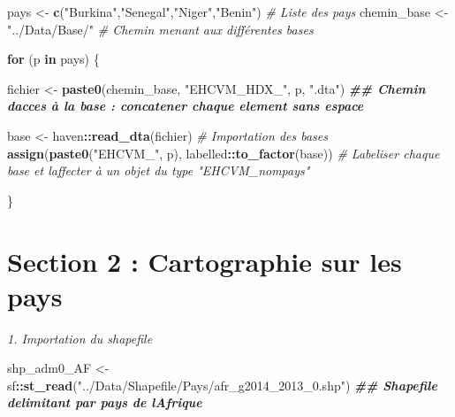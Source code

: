 \documentclass[
]{article}
\newenvironment{Shaded}{\begin{snugshade}}{\end{snugshade}}
\newcommand{\CommentTok}[1]{\textcolor[rgb]{0.56,0.35,0.01}{\textit{#1}}}
\newcommand{\ControlFlowTok}[1]{\textcolor[rgb]{0.13,0.29,0.53}{\textbf{#1}}}
\newcommand{\DocumentationTok}[1]{\textcolor[rgb]{0.56,0.35,0.01}{\textbf{\textit{#1}}}}
\newcommand{\FunctionTok}[1]{\textcolor[rgb]{0.13,0.29,0.53}{\textbf{#1}}}
\newcommand{\NormalTok}[1]{#1}
\newcommand{\OtherTok}[1]{\textcolor[rgb]{0.56,0.35,0.01}{#1}}
\newcommand{\SpecialCharTok}[1]{\textcolor[rgb]{0.81,0.36,0.00}{\textbf{#1}}}
\newcommand{\StringTok}[1]{\textcolor[rgb]{0.31,0.60,0.02}{#1}}
\begin{document}
\begin{Shaded}
\begin{Highlighting}[]
\NormalTok{pays  }\OtherTok{\textless{}{-}}  \FunctionTok{c}\NormalTok{(}\StringTok{"Burkina"}\NormalTok{,}\StringTok{"Senegal"}\NormalTok{,}\StringTok{"Niger"}\NormalTok{,}\StringTok{"Benin"}\NormalTok{) }\CommentTok{\# Liste des pays}
\NormalTok{chemin\_base }\OtherTok{\textless{}{-}}  \StringTok{"../Data/Base/"} \CommentTok{\# Chemin menant aux différentes bases}

\ControlFlowTok{for}\NormalTok{ (p }\ControlFlowTok{in}\NormalTok{ pays) \{}
  
\NormalTok{  fichier }\OtherTok{\textless{}{-}} \FunctionTok{paste0}\NormalTok{(chemin\_base, }\StringTok{"EHCVM\_HDX\_"}\NormalTok{, p, }\StringTok{".dta"}\NormalTok{) }\DocumentationTok{\#\# Chemin d\textquotesingle{}acces à la base : concatener chaque element sans espace}
  
\NormalTok{  base }\OtherTok{\textless{}{-}}\NormalTok{ haven}\SpecialCharTok{::}\FunctionTok{read\_dta}\NormalTok{(fichier) }\CommentTok{\# Importation des bases}
  \FunctionTok{assign}\NormalTok{(}\FunctionTok{paste0}\NormalTok{(}\StringTok{"EHCVM\_"}\NormalTok{, p), labelled}\SpecialCharTok{::}\FunctionTok{to\_factor}\NormalTok{(base)) }\CommentTok{\# Labeliser chaque base et l\textquotesingle{}affecter à un objet du type "EHCVM\_nompays"}
  
\NormalTok{\}}
\end{Highlighting}
\end{Shaded}

\newpage

\section{\texorpdfstring{\textbf{Section 2 : Cartographie sur les
pays}}{Section 2 : Cartographie sur les pays}}\label{section-2-cartographie-sur-les-pays}

\emph{1. Importation du shapefile}

\begin{Shaded}
\begin{Highlighting}[]
\NormalTok{shp\_adm0\_AF }\OtherTok{\textless{}{-}}\NormalTok{ sf}\SpecialCharTok{::}\FunctionTok{st\_read}\NormalTok{(}\StringTok{"../Data/Shapefile/Pays/afr\_g2014\_2013\_0.shp"}\NormalTok{) }\DocumentationTok{\#\# Shapefile delimitant par pays de l\textquotesingle{}Afrique}
\end{Highlighting}
\end{Shaded}
\end{document}
